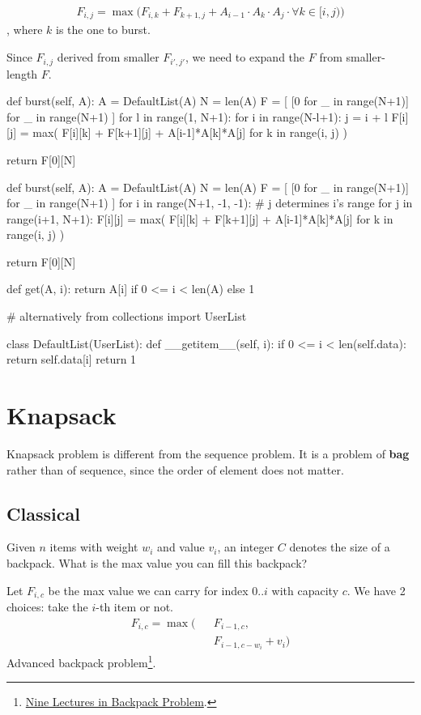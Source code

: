 \begin{align*}
F_{i, j} = \max\Big(F_{i,k} + F_{k+1, j} + A_{i-1} \cdot A_k \cdot A_j \cdot \forall k \in [i, j)\Big)
\end{align*}
, where $k$ is the one to burst. 

Since $F_{i, j}$ derived from smaller $F_{i', j'}$, we need to expand the $F$ from smaller-length $F$.
\begin{python}
def burst(self, A):
    A = DefaultList(A)
    N = len(A)
    F = [
        [0 for _ in range(N+1)]
        for _ in range(N+1)
    ]
    for l in range(1, N+1):
        for i in range(N-l+1):
            j = i + l
            F[i][j] = max(
                F[i][k] + F[k+1][j] + A[i-1]*A[k]*A[j]
                for k in range(i, j)
            )

    return F[0][N]

def burst(self, A):
    A = DefaultList(A)
    N = len(A)
    F = [
        [0 for _ in range(N+1)]
        for _ in range(N+1)
    ]
    for i in range(N+1, -1, -1):
        # j determines i's range
        for j in range(i+1, N+1):
            F[i][j] = max(
                F[i][k] + F[k+1][j] + A[i-1]*A[k]*A[j]
                for k in range(i, j)
            )

    return F[0][N]

def get(A, i):
    return A[i] if 0 <= i < len(A) else 1

# alternatively 
from collections import UserList

class DefaultList(UserList):
    def __getitem__(self, i):
        if 0 <= i < len(self.data):
            return self.data[i]
        return 1    
\end{python}

\section{Knapsack}
Knapsack problem is different from the sequence problem. It is a problem of \textbf{bag} rather than of sequence, since the order of element does not matter. 

\subsection{Classical}
Given $n$ items with weight $w_i$ and value $v_i$, an integer $C$ denotes the size of a backpack. What is the max value you can fill this backpack?

Let $F_{i, c}$ be the max value we can carry for index $0..i$ with capacity $c$. We have 2 choices: take the $i$-th item or not.
\begin{eqnarray*}
F_{i, c}= \max\big(&&F_{i-1, c}, \\
&&F_{i-1, c-w_i}+v_i\big)
\end{eqnarray*}
Advanced backpack problem\footnote{\href{http://github.com/tianyicui/pack}{Nine Lectures in Backpack Problem}.}. 

